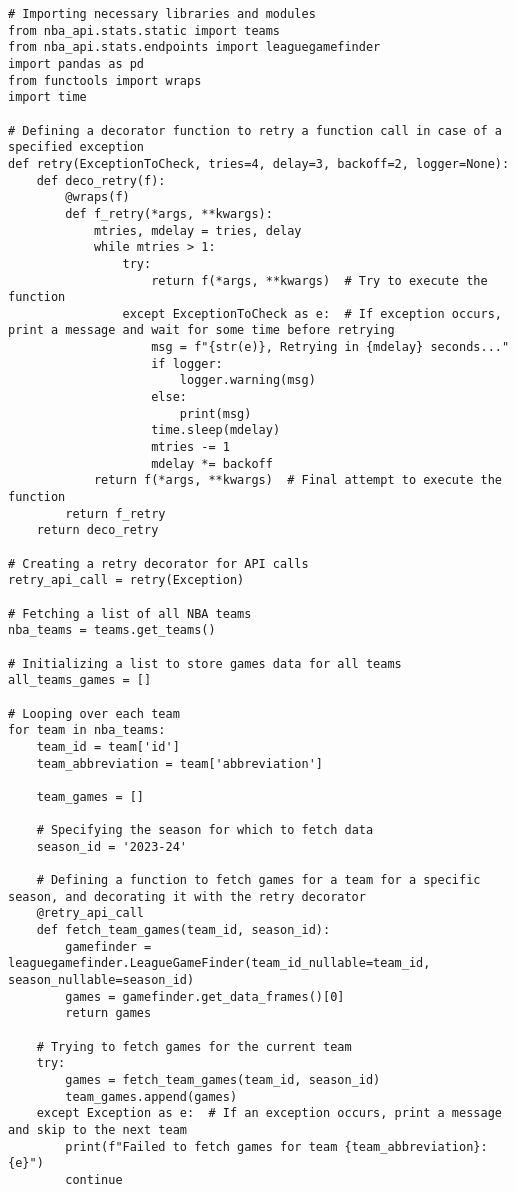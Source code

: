 \begin{verbatim}
# Importing necessary libraries and modules
from nba_api.stats.static import teams
from nba_api.stats.endpoints import leaguegamefinder
import pandas as pd
from functools import wraps
import time

# Defining a decorator function to retry a function call in case of a specified exception
def retry(ExceptionToCheck, tries=4, delay=3, backoff=2, logger=None):
    def deco_retry(f):
        @wraps(f)
        def f_retry(*args, **kwargs):
            mtries, mdelay = tries, delay
            while mtries > 1:
                try:
                    return f(*args, **kwargs)  # Try to execute the function
                except ExceptionToCheck as e:  # If exception occurs, print a message and wait for some time before retrying
                    msg = f"{str(e)}, Retrying in {mdelay} seconds..."
                    if logger:
                        logger.warning(msg)
                    else:
                        print(msg)
                    time.sleep(mdelay)
                    mtries -= 1
                    mdelay *= backoff
            return f(*args, **kwargs)  # Final attempt to execute the function
        return f_retry
    return deco_retry

# Creating a retry decorator for API calls
retry_api_call = retry(Exception)

# Fetching a list of all NBA teams
nba_teams = teams.get_teams()

# Initializing a list to store games data for all teams
all_teams_games = []

# Looping over each team
for team in nba_teams:
    team_id = team['id']
    team_abbreviation = team['abbreviation']

    team_games = []

    # Specifying the season for which to fetch data
    season_id = '2023-24'

    # Defining a function to fetch games for a team for a specific season, and decorating it with the retry decorator
    @retry_api_call
    def fetch_team_games(team_id, season_id):
        gamefinder = leaguegamefinder.LeagueGameFinder(team_id_nullable=team_id, season_nullable=season_id)
        games = gamefinder.get_data_frames()[0]
        return games

    # Trying to fetch games for the current team
    try:
        games = fetch_team_games(team_id, season_id)
        team_games.append(games)
    except Exception as e:  # If an exception occurs, print a message and skip to the next team
        print(f"Failed to fetch games for team {team_abbreviation}: {e}")
        continue


\end{verbatim}
